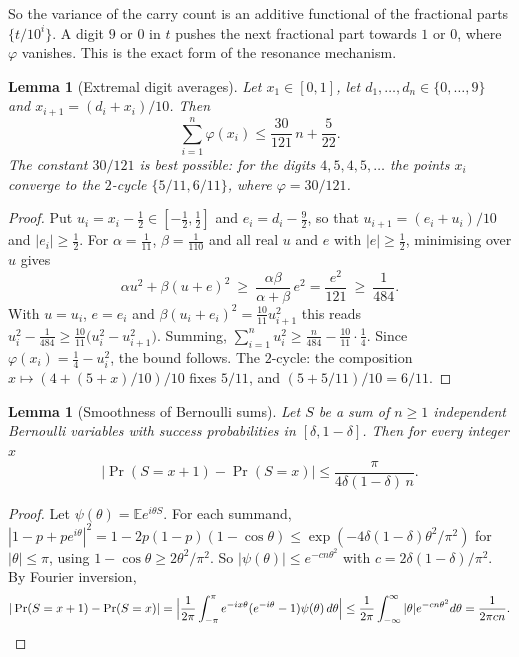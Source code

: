 \documentclass[11pt]{article}
\newtheorem{lemma}[theorem]{Lemma}
\theoremstyle{definition}
\theoremstyle{remark}
\begin{document}
So the variance of the carry count is an additive functional of the
fractional parts $\{t/10^i\}$. A digit $9$ or $0$ in $t$ pushes the next
fractional part towards $1$ or $0$, where $\varphi$ vanishes. This is the
exact form of the resonance mechanism.

\begin{lemma}[Extremal digit averages]\label{lem:kappa}
Let $x_1\in[0,1]$, let $d_1,\dots,d_n\in\{0,\dots,9\}$ and
$x_{i+1}=(d_i+x_i)/10$. Then
\[
  \sum_{i=1}^n\varphi(x_i)\le\frac{30}{121}\,n+\frac5{22}.
\]
The constant $30/121$ is best possible: for the digits $4,5,4,5,\dots$ the
points $x_i$ converge to the $2$-cycle $\{5/11,6/11\}$, where
$\varphi=30/121$.
\end{lemma}

\begin{proof}
Put $u_i=x_i-\frac12\in[-\frac12,\frac12]$ and $e_i=d_i-\frac92$, so that
$u_{i+1}=(e_i+u_i)/10$ and $|e_i|\ge\frac12$. For $\alpha=\frac1{11}$,
$\beta=\frac1{110}$ and all real $u$ and $e$ with $|e|\ge\frac12$,
minimising over $u$ gives
\[
  \alpha u^2+\beta(u+e)^2\ \ge\ \frac{\alpha\beta}{\alpha+\beta}\,e^2
  =\frac{e^2}{121}\ \ge\ \frac1{484}.
\]
With $u=u_i$, $e=e_i$ and $\beta(u_i+e_i)^2=\frac{10}{11}u_{i+1}^2$ this reads
$u_i^2-\frac1{484}\ge\frac{10}{11}\bigl(u_i^2-u_{i+1}^2\bigr)$. Summing,
$\sum_{i=1}^nu_i^2\ge\frac n{484}-\frac{10}{11}\cdot\frac14$. Since
$\varphi(x_i)=\frac14-u_i^2$, the bound follows. The $2$-cycle: the composition
$x\mapsto(4+(5+x)/10)/10$ fixes $5/11$, and $(5+5/11)/10=6/11$.
\end{proof}

\begin{lemma}[Smoothness of Bernoulli sums]\label{lem:smooth}
Let $S$ be a sum of $n\ge1$ independent Bernoulli variables with success
probabilities in $[\delta,1-\delta]$. Then for every integer $x$
\[
  |\Pr(S=x+1)-\Pr(S=x)|\le\frac{\pi}{4\delta(1-\delta)\,n}.
\]
\end{lemma}

\begin{proof}
Let $\psi(\theta)=\mathbb Ee^{i\theta S}$. For each summand,
$|1-p+pe^{i\theta}|^2=1-2p(1-p)(1-\cos\theta)\le
\exp(-4\delta(1-\delta)\theta^2/\pi^2)$ for $|\theta|\le\pi$, using
$1-\cos\theta\ge2\theta^2/\pi^2$. So
$|\psi(\theta)|\le e^{-c n\theta^2}$ with $c=2\delta(1-\delta)/\pi^2$. By
Fourier inversion,
\[
  |\Pr(S=x+1)-\Pr(S=x)|=\Bigl|\frac1{2\pi}\int_{-\pi}^{\pi}
  e^{-ix\theta}(e^{-i\theta}-1)\psi(\theta)\,d\theta\Bigr|
  \le\frac1{2\pi}\int_{-\infty}^{\infty}|\theta|e^{-cn\theta^2}d\theta
  =\frac1{2\pi cn}. \qedhere
\]
\end{proof}
\end{document}
